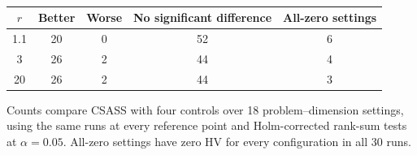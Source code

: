 \begin{table}[!htbp]
\begin{ROneBlock}
\centering
\small
\caption{}\label{tab:hv-reference-sensitivity}
\begin{tabular}{ccccc}
\toprule
$r$ & Better & Worse & No significant difference & All-zero settings \\
\midrule
1.1 & 20 & 0 & 52 & 6 \\
3 & 26 & 2 & 44 & 4 \\
20 & 26 & 2 & 44 & 3 \\
\bottomrule
\end{tabular}
\par\vspace{3pt}
\parbox{0.95\linewidth}{\footnotesize Counts compare CSASS with four controls over 18 problem--dimension settings, using the same runs at every reference point and Holm-corrected rank-sum tests at $\alpha=0.05$. All-zero settings have zero HV for every configuration in all 30 runs.}
\end{ROneBlock}
\end{table}
